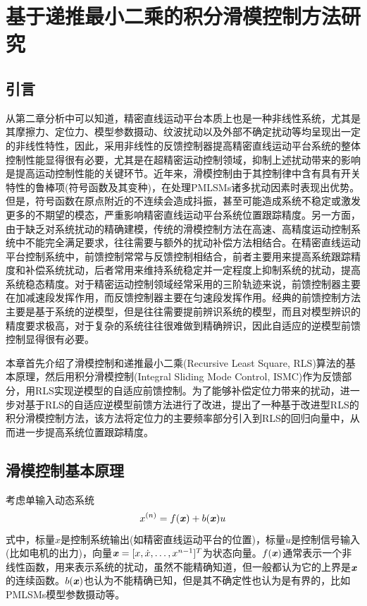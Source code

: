 \chapter{基于递推最小二乘的积分滑模控制方法研究}
\section{引言}
从第二章分析中可以知道，精密直线运动平台本质上也是一种非线性系统，尤其是其摩擦力、定位力、模型参数摄动、纹波扰动以及外部不确定扰动等均呈现出一定的非线性特性，因此，采用非线性的反馈控制器提高精密直线运动平台系统的整体控制性能显得很有必要，尤其是在超精密运动控制领域，抑制上述扰动带来的影响是提高运动控制性能的关键环节。近年来，滑模控制由于其控制律中含有具有开关特性的鲁棒项(符号函数及其变种)，在处理PMLSMs诸多扰动因素时表现出优势\cite{wang2015modified,slotine1983tracking,burton1986continuous,tseng2010chattering,zhang2013design,lee2017adaptive}。但是，符号函数在原点附近的不连续会造成抖振，甚至可能造成系统不稳定或激发更多的不期望的模态，严重影响精密直线运动平台系统位置跟踪精度\cite{tseng2010chattering}。另一方面，由于缺乏对系统扰动的精确建模，传统的滑模控制方法在高速、高精度运动控制系统中不能完全满足要求，往往需要与额外的扰动补偿方法相结合。在精密直线运动平台控制系统中，前馈控制常常与反馈控制相结合，前者主要用来提高系统跟踪精度和补偿系统扰动，后者常用来维持系统稳定并一定程度上抑制系统的扰动，提高系统稳态精度。对于精密运动控制领域经常采用的三阶轨迹来说，前馈控制器主要在加减速段发挥作用，而反馈控制器主要在匀速段发挥作用。经典的前馈控制方法主要是基于系统的逆模型，但是往往需要提前辨识系统的模型，而且对模型辨识的精度要求极高，对于复杂的系统往往很难做到精确辨识，因此自适应的逆模型前馈控制显得很有必要。

本章首先介绍了滑模控制和递推最小二乘(Recursive Least Square, RLS)算法的基本原理，然后用积分滑模控制(Integral Sliding Mode Control, ISMC)作为反馈部分，用RLS实现逆模型的自适应前馈控制。为了能够补偿定位力带来的扰动，进一步对基于RLS的自适应逆模型前馈方法进行了改进，提出了一种基于改进型RLS的积分滑模控制方法，该方法将定位力的主要频率部分引入到RLS的回归向量中，从而进一步提高系统位置跟踪精度。
\section{滑模控制基本原理}
考虑单输入动态系统\cite{slotine2006应用非线性控制}
\begin{equation}
\label{4单输入动态系统}
x^{(n)}=f(\textbf{\textit{x}})+b(\textbf{\textit{x}})u
\end{equation}
式中，标量$x$是控制系统输出(如精密直线运动平台的位置)，标量$u$是控制信号输入(比如电机的出力)，向量$\textbf{\textit{x}}=[x,\dot{x},\dots,x^{n-1}]^T$为状态向量。$f(\textbf{\textit{x}})$通常表示一个非线性函数，用来表示系统的扰动，虽然不能精确知道，但一般都认为它的上界是$\textbf{\textit{x}}$的连续函数。$b(\textbf{\textit{x}})$也认为不能精确已知，但是其不确定性也认为是有界的，比如PMLSMs模型参数摄动等。

